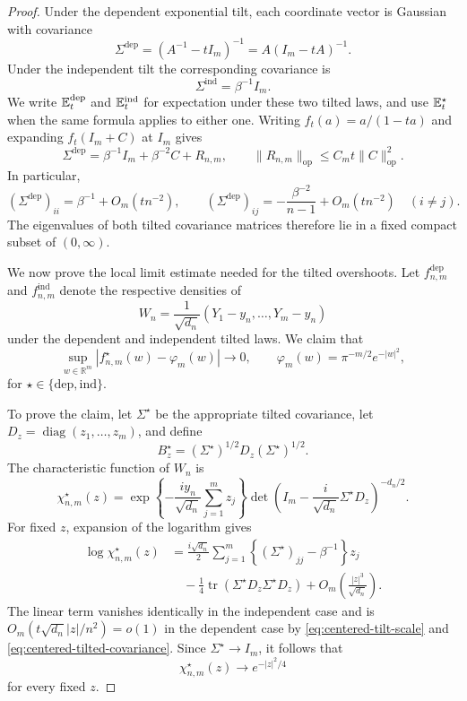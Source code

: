 \begin{proof}
Under the dependent exponential tilt, each coordinate vector is Gaussian
with covariance
\[
 \Sigma^{\mathrm{dep}}
 =
 (A^{-1}-tI_m)^{-1}
 =
 A(I_m-tA)^{-1}.
\]
Under the independent tilt the corresponding covariance is
\[
 \Sigma^{\mathrm{ind}}=\beta^{-1}I_m.
\]
We write \(\mathbb E_t^{\mathrm{dep}}\) and \(\mathbb E_t^{\mathrm{ind}}\) for expectation
under these two tilted laws, and use \(\mathbb E_t^\star\) when the same formula
applies to either one.
Writing \(f_t(a)=a/(1-ta)\) and expanding \(f_t(I_m+C)\) at \(I_m\)
gives
\[
 \Sigma^{\mathrm{dep}}
 =
 \beta^{-1}I_m+\beta^{-2}C+R_{n,m},
 \qquad
 \|R_{n,m}\|_{\mathrm{op}}
 \le C_m t\|C\|_{\mathrm{op}}^2.
\]
In particular,
\begin{equation}
\label{eq:centered-tilted-covariance}
 (\Sigma^{\mathrm{dep}})_{ii}
 =
 \beta^{-1}+O_m(tn^{-2}),
 \qquad
 (\Sigma^{\mathrm{dep}})_{ij}
 =
 -\frac{\beta^{-2}}{n-1}+O_m(tn^{-2})
 \quad(i\ne j).
\end{equation}
The eigenvalues of both tilted covariance matrices therefore lie in a
fixed compact subset of \((0,\infty)\).

We now prove the local limit estimate needed for the tilted overshoots.
Let \(f_{n,m}^{\mathrm{dep}}\) and \(f_{n,m}^{\mathrm{ind}}\) denote the
respective densities of
\[
 W_n
 =
 \frac1{\sqrt{d_n}}
 (Y_1-y_n,\ldots,Y_m-y_n)
\]
under the dependent and independent tilted laws. We claim that
\begin{equation}
\label{eq:centered-tilted-local-limit}
 \sup_{w\in\mathbb R^m}
 \left|f_{n,m}^{\star}(w)-\varphi_m(w)\right|
 \longrightarrow0,
 \qquad
 \varphi_m(w)=\pi^{-m/2}e^{-|w|^2},
\end{equation}
for \(\star\in\{\mathrm{dep},\mathrm{ind}\}\).

To prove the claim, let \(\Sigma^\star\) be the appropriate tilted
covariance, let \(D_z=\operatorname{diag}(z_1,\ldots,z_m)\), and define
\[
 B_z^\star=(\Sigma^\star)^{1/2}D_z(\Sigma^\star)^{1/2}.
\]
The characteristic function of \(W_n\) is
\begin{equation}
\label{eq:centered-tilted-characteristic-function}
 \chi_{n,m}^{\star}(z)
 =
 \exp\left\{-\frac{iy_n}{\sqrt{d_n}}\sum_{j=1}^mz_j\right\}
 \det\left(
 I_m-\frac{i}{\sqrt{d_n}}\Sigma^\star D_z
 \right)^{-d_n/2}.
\end{equation}
For fixed \(z\), expansion of the logarithm gives
\begin{align*}
 \log\chi_{n,m}^{\star}(z)
 &=
 \frac{i\sqrt{d_n}}2
 \sum_{j=1}^m
 \left\{(\Sigma^\star)_{jj}-\beta^{-1}\right\}z_j\\
 &\quad
 -\frac14
 \operatorname{tr}(\Sigma^\star D_z\Sigma^\star D_z)
 +O_m\left(\frac{|z|^3}{\sqrt{d_n}}\right).
\end{align*}
The linear term vanishes identically in the independent case and is
\(O_m(t\sqrt{d_n}|z|/n^2)=o(1)\) in the dependent case by
\eqref{eq:centered-tilt-scale} and
\eqref{eq:centered-tilted-covariance}. Since
\(\Sigma^\star\to I_m\), it follows that
\[
 \chi_{n,m}^{\star}(z)\longrightarrow e^{-|z|^2/4}
\]
for every fixed \(z\).


\end{proof}
